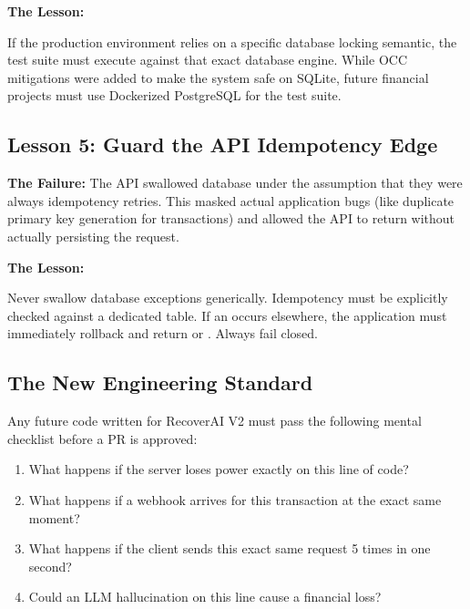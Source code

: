 \textbf{The Lesson:}
\begin{tcolorbox}[infobox={Test Against Production Equivalents}]
If the production environment relies on a specific database locking semantic, the test suite must execute against that exact database engine. While OCC mitigations were added to make the system safe on SQLite, future financial projects must use Dockerized PostgreSQL for the test suite.
\end{tcolorbox}

\vspace{0.5cm}

\subsection{Lesson 5: Guard the API Idempotency Edge}

\textbf{The Failure:} The API swallowed database  under the assumption that they were always idempotency retries. This masked actual application bugs (like duplicate primary key generation for transactions) and allowed the API to return  without actually persisting the request.

\textbf{The Lesson:}
\begin{tcolorbox}[infobox={Fail Closed}]
Never swallow database exceptions generically. Idempotency must be explicitly checked against a dedicated  table. If an  occurs elsewhere, the application must immediately rollback and return  or . Always fail closed.
\end{tcolorbox}

\vspace{0.8cm}

\subsection{The New Engineering Standard}

Any future code written for RecoverAI V2 must pass the following mental checklist before a PR is approved:

\begin{enumerate}
    \item What happens if the server loses power exactly on this line of code?
    \item What happens if a webhook arrives for this transaction at the exact same moment?
    \item What happens if the client sends this exact same request 5 times in one second?
    \item Could an LLM hallucination on this line cause a financial loss?
\end{enumerate}

